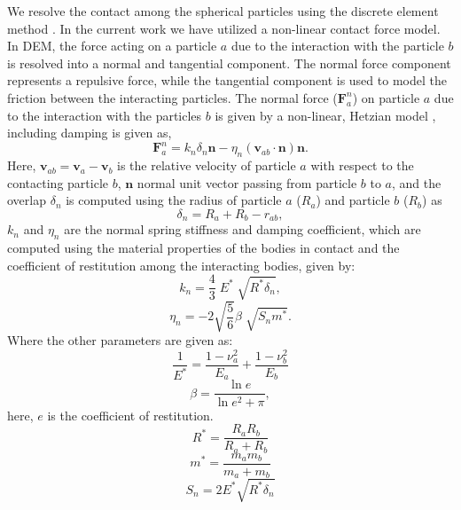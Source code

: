 \documentclass[preprint,12pt]{elsarticle}
\newcommand{\teng}[1]{\ensuremath{\boldsymbol{#1}}}
\newcommand{\ten}[1]{\ensuremath{\mathbf{#1}}}
\begin{document}
We resolve the contact among the spherical particles using the discrete
element method \cite{luding_dem_2008}. In the current work we have utilized a
non-linear contact force model. In DEM, the force acting on a particle $a$ due
to the interaction with the particle $b$ is resolved into a normal and
tangential component. The normal force component represents a repulsive force,
while the tangential component is used to model the friction between the
interacting particles.  The normal force ($\teng{F}_a^{n}$) on particle $a$
due to the interaction with the particles $b$ is given by a non-linear,
Hetzian model \cite{brilliantov1996model}, including damping is given as,
\begin{equation}
  \label{eq:contact-algorithm-normal}
  \ten{F}_a^n = k_n \delta_{n} \ten{n} - \eta_n (\ten{v}_{ab} \cdot \ten{n}) \ten{n}.
\end{equation}
Here, $\ten{v}_{ab} = \ten{v}_{a} - \ten{v}_b$ is the relative velocity of
particle $a$ with respect to the contacting particle $b$,
$\ten{n}$ normal unit vector passing from particle $b$ to $a$, and the overlap $\delta_{n}$ is computed
using the radius of particle $a$ ($R_a$) and particle $b$ ($R_b$) as
\begin{equation}
  \label{eq:cf-overlap}
  \delta_{n} = R_{a} + R_{b} - r_{ab},
\end{equation}
$k_n$ and $\eta_n$ are the normal spring stiffness and damping coefficient, which
are computed using the material properties of the bodies in contact and the
coefficient of restitution among the interacting bodies, given by:
\begin{equation}
  \label{eq:kf-stiffness}
  k_n = \frac{4}{3} \; E^{*} \; \sqrt{R^{*} \delta_n},
\end{equation}
\begin{equation}
  \label{eq:kf-stiffness}
  \eta_n = -2 \sqrt{\frac{5}{6}} \beta \; \sqrt{S_n m^*}.
\end{equation}
Where the other parameters are given as:
\begin{equation}
  \label{eq:kf-stiffness}
  \frac{1}{E^{*}} = \frac{1 -\nu_a^2}{E_a} + \frac{1 -\nu_b^2}{E_b}
\end{equation}
\begin{equation}
  \label{eq:kf-stiffness}
  \beta = \frac{\ln{e}}{\ln{e}^2 + \pi},
\end{equation}
here, $e$ is the coefficient of restitution.
\begin{equation}
  \label{eq:kf-stiffness}
  R^{*} = \frac{R_a R_b}{R_a + R_b}
\end{equation}
\begin{equation}
  \label{eq:kf-stiffness}
  m^{*} = \frac{m_a m_b}{m_a + m_b}
\end{equation}
\begin{equation}
  \label{eq:kf-stiffness}
  S_n = 2 E^{*} \sqrt{R^{*} \delta_n}
\end{equation}
\end{document}
